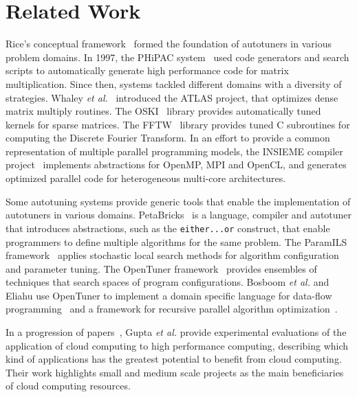 \documentclass[a4paper, 12pt]{article}
\begin{document}
\section{Related Work} \label{sec:related}

Rice's conceptual framework~\cite{rice1976algorithm} formed the foundation
of autotuners in various problem domains.  In 1997, the PHiPAC
system~\cite{bilmes1997phipac} used code generators and search scripts to
automatically generate high performance code
for matrix multiplication. Since then, systems tackled different domains with a
diversity of strategies. Whaley \emph{et al.}~\cite{whaley1998atlas} introduced
the ATLAS project, that optimizes dense matrix multiply routines. The
OSKI~\cite{vuduc2005oski} library provides automatically tuned kernels for
sparse matrices. The FFTW~\cite{frigo1998fftw} library provides tuned C
subroutines for computing the Discrete Fourier Transform.  In an effort to
provide a common representation of multiple parallel programming models, the
INSIEME compiler project~\cite{jordan2012multi} implements abstractions for
OpenMP, MPI and OpenCL, and generates optimized parallel code for heterogeneous
multi-core architectures.

Some autotuning systems provide generic tools that enable the implementation of
autotuners in various domains. PetaBricks~\cite{ansel2009petabricks} is a
language, compiler and autotuner that introduces abstractions, such as the
\texttt{\footnotesize either...or} construct, that enable programmers to define
multiple algorithms for the same problem.  The ParamILS
framework~\cite{hutter2009paramils} applies stochastic local search methods
for algorithm configuration and parameter tuning.  The OpenTuner
framework~\cite{ansel2014opentuner} provides ensembles of techniques that
search spaces of program configurations. Bosboom \emph{et al.} and Eliahu use
OpenTuner to implement a domain specific language for data-flow
programming~\cite{bosboom2014streamjit} and a framework for recursive parallel
algorithm optimization~\cite{eliahu2015frpa}.

In a progression of papers~\cite{gupta2012exploring,gupta2014evaluating,gupta2013hpccloud},
Gupta \emph{et al.} provide experimental evaluations of the application of
cloud computing to high performance computing, describing which kind of
applications has the greatest potential to benefit from cloud computing.
Their work highlights small and medium scale projects as the main beneficiaries
of cloud computing resources.
\end{document}
